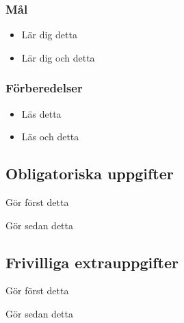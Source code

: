 

\subsubsection{Mål}
\begin{itemize}[nosep]
\item Lär dig detta
\item Lär dig och detta
\end{itemize}

\subsubsection{Förberedelser}
\begin{itemize}[nosep]
\item Läs detta
\item Läs och detta
\end{itemize}

\subsection{Obligatoriska uppgifter}


\Task Gör först detta

\Task Gör sedan detta

\subsection{Frivilliga extrauppgifter}

\Task Gör först detta

\Task Gör sedan detta
